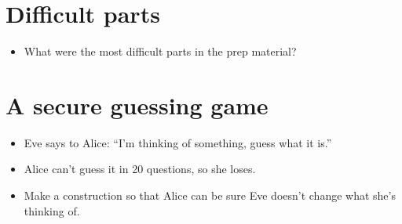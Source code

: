 \mode*

\section{Difficult parts}

\begin{frame}
  \begin{question}
    \begin{itemize}
      \item What were the most difficult parts in the prep material?
    \end{itemize}
  \end{question}
\end{frame}

\section{A secure guessing game}

\begin{frame}
  \begin{exercise}
    \begin{itemize}
      \item Eve says to Alice: \enquote{I'm thinking of something, guess what 
        it is.}
      \item Alice can't guess it in 20 questions, so she loses.
      \item Make a construction so that Alice can be sure Eve doesn't change 
        what she's thinking of.
    \end{itemize}
  \end{exercise}
\end{frame}

